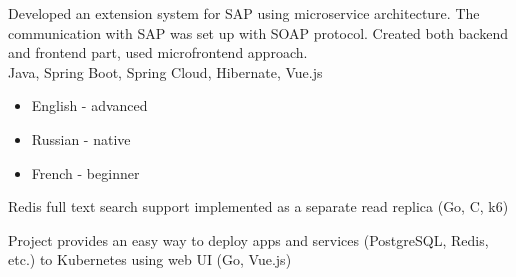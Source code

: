 \documentclass[10pt,a4paper,ragged2e,withhyper]{altacv}
\begin{document}
\begin{paracol}{2}
\divider


Developed an extension system for SAP using microservice architecture. The communication with SAP was set up with SOAP protocol. Created both backend and frontend part, used microfrontend approach.\\
Java, Spring Boot, Spring Cloud, Hibernate, Vue.js

\switchcolumn








\vspace{0.2cm}





\begin{itemize}
\item English - advanced
\item Russian - native
\item French - beginner
\end{itemize}



Redis full text search support implemented as a separate read replica (Go, C, k6)


\divider


Project provides an easy way to deploy apps and services (PostgreSQL, Redis, etc.) to Kubernetes using web UI (Go, Vue.js)


\end{paracol}
\end{document}
